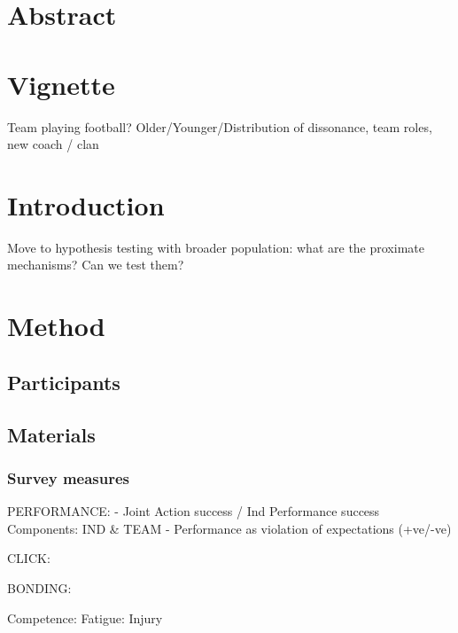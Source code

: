 


\section{Abstract}

\section{Vignette}
Team playing football? Older/Younger/Distribution of dissonance, team roles, new coach / clan

\section{Introduction} 
Move to hypothesis testing with broader population: what are the proximate mechanisms? Can we test them?

\section{Method}

  \subsection{Participants}

  \subsection{Materials}

    \subsubsection{Survey measures}

  PERFORMANCE:
  - Joint Action success / Ind Performance success
        Components: IND & TEAM
  - Performance as violation of expectations (+ve/-ve)

  CLICK:

  BONDING:

  Competence:
  Fatigue:
  Injury
